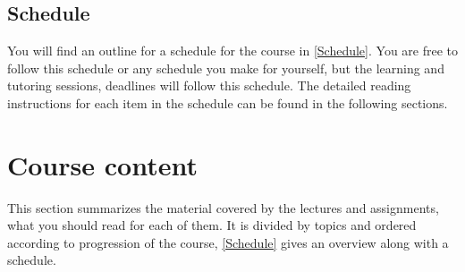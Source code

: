 \subsection{Schedule}

You will find an outline for a schedule for the course in \cref{Schedule}.
You are free to follow this schedule or any schedule you make for yourself, but 
the learning and tutoring sessions, deadlines \etc will follow this schedule.
The detailed reading instructions for each item in the schedule can be found in 
the following sections.

\begin{frame}[allowframebreaks]

\end{frame}


\section<article>{Course content}

This section summarizes the material covered by the lectures and assignments, 
\ie what you should read for each of them.
It is divided by topics and ordered according to progression of the course, 
\cref{Schedule} gives an overview along with a schedule.






